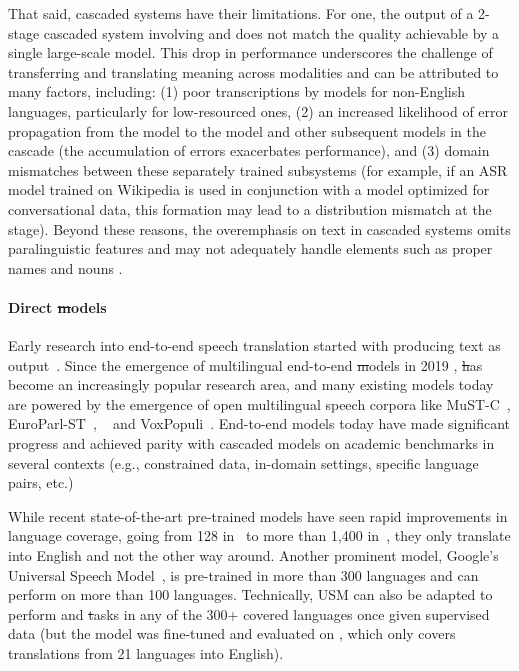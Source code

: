 That said, cascaded systems have their limitations. For one, the output of a 2-stage cascaded \st{} system involving \asr and \mt does not match the quality achievable by a single large-scale \mt model.
This drop in performance underscores the challenge of transferring and translating meaning across modalities and can be attributed to many factors, including:
(1) poor transcriptions by \asr models for non-English languages, particularly for low-resourced ones,
(2) an increased likelihood of error propagation from the \asr model to the \mt model and other subsequent models in the cascade (the accumulation of errors exacerbates performance), and
(3) domain mismatches between these separately trained subsystems (for example, if an ASR model trained on Wikipedia is used in conjunction with a \mt model optimized for conversational data, this formation may lead to a distribution mismatch at the \mt stage). Beyond these reasons, the overemphasis on text in cascaded systems omits paralinguistic features and may not adequately handle elements such as proper names and nouns \citep{Rubenstein2023AudioPaLMAL}. %



\paragraph{Direct \st models}
Early research into end-to-end speech translation started with producing text as output~\citep{7472621,Berard2016ListenAT,berard2018end}.
Since the emergence of multilingual end-to-end \st models in 2019 \citep{Gangi2019OnetoManyME,inaguma2019multilingual}, \st has become an increasingly popular research area, and many existing models today are powered by the emergence of open multilingual speech corpora like \mbox{MuST-C}~\citep{di2019must}, EuroParl-ST~\citep{iranzo2020europarl}, \covost~\citep{wang2021covost} and VoxPopuli~\citep{wang-etal-2021-voxpopuli}.  End-to-end models today have made significant progress and achieved parity with cascaded models on academic benchmarks in several contexts (e.g., constrained data, in-domain settings, specific language pairs, etc.)~\citep{ansari-etal-2020-findings,potapczyk-przybysz-2020-srpols}

While recent state-of-the-art pre-trained models have seen rapid improvements in language coverage, going from 128 in~\cite{babu2021xls} to more than 1,400 in~\cite{mms}, they only translate into English and not the other way around. Another prominent model, Google's Universal Speech Model~\citep{google_usm}, is pre-trained in more than 300 languages and can perform \asr on more than 100 languages. Technically, USM can also be adapted to perform \asr and \st tasks in any of the 300+ covered languages
once given supervised data (but the model was fine-tuned and evaluated on \covost, which only covers translations from 21 languages into English).

